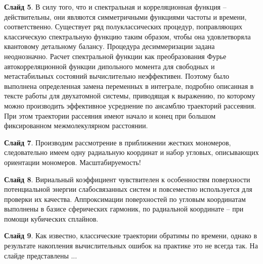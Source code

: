 \documentclass[12pt]{article}
\begin{document}
\textbf{Слайд 5}. В силу того, что и спектральная и корреляционная функция -- действительны, они являются симметричными функциями частоты и времени, соответственно. Существует ряд полуклассических процедур, поправляющих классическую спектральную функцию таким образом, чтобы она удовлетворяла квантовому детальному балансу. Процедура десиммеризации задана неоднозначно. Расчет спектральной функции как преобразования Фурье автокорреляционной функции дипольного момента для свободных и метастабильных состояний вычислительно неэффективен. Поэтому было выполнена определенная замена переменных в интеграле, подробно описанная в тексте работы для двухатомной системы, приводящая к выражению, по которому можно производить эффективное усреднение по ансамблю траекторий рассеяния. При этом траектории рассеяния имеют начало и конец при большом фиксированном межмолекулярном расстоянии. \par
\textbf{Слайд 7}. Производим рассмотрение в приближении жестких мономеров, следовательно имеем одну радиальную координат и набор угловых, описывающих ориентации мономеров. Масштабируемость! \par
\textbf{Слайд 8}. Вириальный коэффициент чувствителен к особенностям поверхности потенциальной энергии слабосвязанных систем и повсеместно используется для проверки их качества. Аппроксимации поверхностей по угловым координатам выполнены в базисе сферических гармоник, по радиальной координате -- при помощи кубических сплайнов. \par
\textbf{Слайд 9}. Как известно, классические траектории обратимы по времени, однако в результате накопления вычислительных ошибок на практике это не всегда так. На слайде представлены ...
\end{document}

